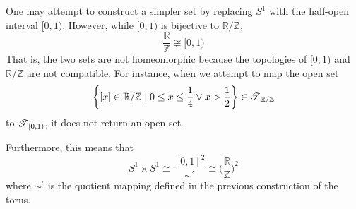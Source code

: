 \begin{example}
    One may attempt to construct a simpler set by replacing $S^1$ with the half-open interval $[0,1)$. However, while $[0,1)$ is bijective to $\mathbb{R} / \mathbb{Z}$,
    \begin{equation}
      \frac{\mathbb{R}}{\mathbb{Z}} \not\cong [0,1)
    \end{equation}
    That is, the two sets are not homeomorphic because the topologies of $[0,1)$ and $\mathbb{R} / \mathbb{Z}$ are not compatible. For instance, when we attempt to map the open set 
    \begin{equation}
      \bigg\{ [x] \in \mathbb{R} / \mathbb{Z} \mid 0 \leq x \leq \frac{1}{4} \vee x > \frac{1}{2} \bigg\} \in \operatorname{\mathscr{T}}_{\mathbb{R} / \mathbb{Z}}
    \end{equation}
    to $\operatorname{\mathscr{T}}_{[0,1)}$, it does not return an open set. 

    Furthermore, this means that
    \begin{equation}
      S^1 \times S^1 \cong \frac{[0,1]^2}{\sim^\prime} \cong \bigg( \frac{\mathbb{R}}{\mathbb{Z}} \bigg)^2
    \end{equation}
    where $\sim^\prime$ is the quotient mapping defined in the previous construction of the torus. 
  \end{example}

